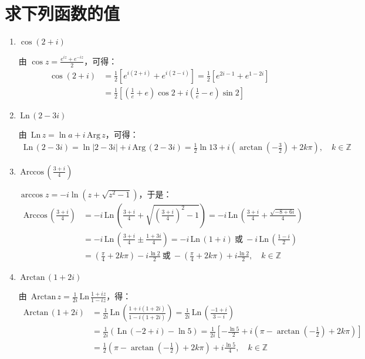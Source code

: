 \documentclass[UTF8]{report}
\def\Ln{\mathrm{\,Ln\,}}
\def\Arg{\mathrm{\,Arg\,}}
\def\Arccos{\mathrm{\,Arccos\,}}
\def\Arctan{\mathrm{\,Arctan\,}}
\theoremstyle{MyLineTheoremStyle} %
\theoremstyle{MyBlockTheoremStyle} %
\theoremstyle{MySubsubsectionStyle} %
\begin{document}
\section{求下列函数的值}
\begin{enumerate}
\item $\cos(2+i)$

由 $\cos z = \frac{e^{iz} + e^{-iz}}{2}$，可得：
\begin{align*}
\cos(2+i) 
&= \frac{1}{2}\left[  e^{i(2+i)} + e^{i(2-i)}  \right] = \frac{1}{2}\left[ e^{2i -1} + e^{1-2i} \right] \\
&= \frac{1}{2}\left[ (\frac{1}{e} + e)\cos 2 + i(\frac{1}{e}-e)\sin 2\right]
\end{align*}

\item $\Ln(2-3i)$

由 $\Ln z = \ln a + i\Arg z$，可得：
\begin{align*}
\Ln (2-3i) = \ln | 2-3i | + i\Arg (2-3i)
= \frac{1}{2}\ln 13 + i\left(\arctan (-\frac{3}{2}) + 2k\pi\right),\quad k \in \mathbb{Z}
\end{align*}

\item $\Arccos (\frac{3+i}{4})$

$\arccos z = -i \ln (z + \sqrt{z^2 -1} )$，于是：
\begin{align*}
\Arccos (\frac{3+i}{4}) 
&= -i \Ln\left(\frac{3+i}{4} + \sqrt{(\frac{3+i}{4})^2 -1} \right) = -i \Ln \left( \frac{3+i}{4} + \frac{\sqrt{-8 + 6i} }{4} \right) \\ 
&= -i \Ln \left( \frac{3+i}{4} \pm \frac{1 + 3i}{4} \right) = -i \Ln(1+i)\  \text{或}\ -i \Ln(\frac{1-i}{2}) \\ 
&= (\frac{\pi}{4} + 2k\pi) - i\frac{\ln 2}{2} \ \text{或}\ -(\frac{\pi}{4} + 2k\pi) + i\frac{\ln 2}{2},\quad k \in \mathbb{Z}
\end{align*}

\item $\Arctan (1+2i)$

由 $\Arctan z = \frac{1}{2i} \Ln \frac{1+iz}{1-iz}$，得：
\begin{align*}
\Arctan (1+2i) 
&= \frac{1}{2i}\Ln \left( \frac{1+i(1+2i)}{1-i(1+2i)} \right)
= \frac{1}{2i}\Ln \left( \frac{-1 + i}{3-i} \right) \\
&= \frac{1}{2i}\left( \Ln (-2+i) - \ln 5 \right) 
= \frac{1}{2i}\left[ -\frac{\ln 5}{2}  + i\left( \pi - \arctan(-\frac{1}{2})  + 2k\pi\right) \right] \\ 
&= \frac{1}{2}\left(\pi - \arctan(-\frac{1}{2})  + 2k\pi\right) + i\frac{\ln 5}{4},\quad k \in \mathbb{Z}
\end{align*}
\end{enumerate}
\end{document}
